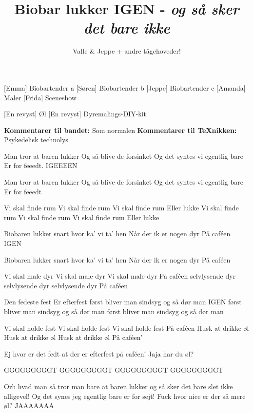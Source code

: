 \documentclass[a4paper,11pt]{article}
\title{Biobar lukker IGEN - \emph{og så sker det bare ikke}}
\author{Valle \& Jeppe + andre tågehoveder!}
\begin{document}
\maketitle

\begin{roles}
  [Emma] Biobartender a
  [Søren] Biobartender b
  [Jeppe] Biobartender c
  [Amanda] Maler
  [Frida] Sceneshow
\end{roles}


\begin{props}
    [En revyst] Øl
    [En revyst] Dyremalings-DIY-kit
\end{props}

\begin{song}
  \textbf{Kommentarer til bandet:} Som normalen
  \textbf{Kommentarer til \TeX nikken:} Psykedelisk technolys

   Man tror at baren lukker
Og så blive de forsinket
Og det syntes vi egentlig bare
Er for feeedt. 
 IGEEEEN


Man tror at baren lukker
Og så blive de forsinket
Og det syntes vi egentlig bare
Er for feeedt


 Vi skal finde rum
Vi skal finde rum 
Vi skal finde rum
Eller lukke
Vi skal finde rum
Vi skal finde rum 
Vi skal finde rum
Eller lukke


Biobaren lukker snart
hvor ka' vi ta’ hen
Når der ik er nogen dyr
På caféen 
 IGEN


 Biobaren lukker snart
hvor ka' vi ta’ hen
Når der ik er nogen dyr
På caféen

Vi skal male dyr
Vi skal male dyr
Vi skal male dyr
På caféen
selvlysende dyr
selvlysende dyr
selvlysende  dyr
På caféen


Den fedeste fest
Er efterfest
først bliver man sindsyg
og så dør man 
IGEN
først bliver man sindsyg
og så dør man 
først bliver man sindsyg
og så dør man 


Vi skal holde fest
Vi skal holde fest
Vi skal holde fest
På caféen
Husk at drikke øl
Husk at drikke øl
Husk at drikke øl
På caféen’


Ej hvor er det fedt at der er efterfest på caféen! Jaja har du øl?


GGGGGGGGGT GGGGGGGGGT GGGGGGGGGT GGGGGGGGGT


Orh hvad man så tror man bare at baren lukker og så sker det bare slet ikke alligevel! Og det synes jeg egentlig bare er for sejt!
Fuck hvor nice er der så mere øl?
JAAAAAAA



\end{song}
\end{document}
